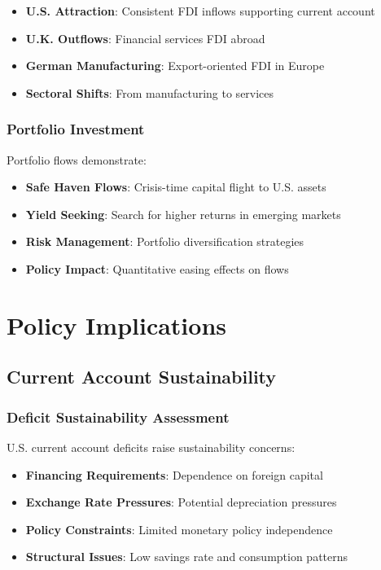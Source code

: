 \documentclass[11pt,a4paper]{article}
\begin{document}
\begin{itemize}
    \item \textbf{U.S. Attraction}: Consistent FDI inflows supporting current account
    \item \textbf{U.K. Outflows}: Financial services FDI abroad
    \item \textbf{German Manufacturing}: Export-oriented FDI in Europe
    \item \textbf{Sectoral Shifts}: From manufacturing to services
\end{itemize}

\subsubsection{Portfolio Investment}
Portfolio flows demonstrate:

\begin{itemize}
    \item \textbf{Safe Haven Flows}: Crisis-time capital flight to U.S. assets
    \item \textbf{Yield Seeking}: Search for higher returns in emerging markets
    \item \textbf{Risk Management}: Portfolio diversification strategies
    \item \textbf{Policy Impact}: Quantitative easing effects on flows
\end{itemize}

\section{Policy Implications}

\subsection{Current Account Sustainability}

\subsubsection{Deficit Sustainability Assessment}
U.S. current account deficits raise sustainability concerns:

\begin{itemize}
    \item \textbf{Financing Requirements}: Dependence on foreign capital
    \item \textbf{Exchange Rate Pressures}: Potential depreciation pressures
    \item \textbf{Policy Constraints}: Limited monetary policy independence
    \item \textbf{Structural Issues}: Low savings rate and consumption patterns
\end{itemize}
\end{document}
